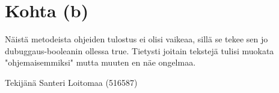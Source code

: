\section{Kohta (b)}
\label{Kohta (b)}

Näistä metodeista ohjeiden tulostus ei olisi vaikeaa, sillä se tekee sen jo dubuggaus-booleanin ollessa true. Tietysti joitain tekstejä tulisi muokata "ohjemaisemmiksi" mutta muuten en näe ongelmaa.


Tekijänä Santeri Loitomaa (516587)
